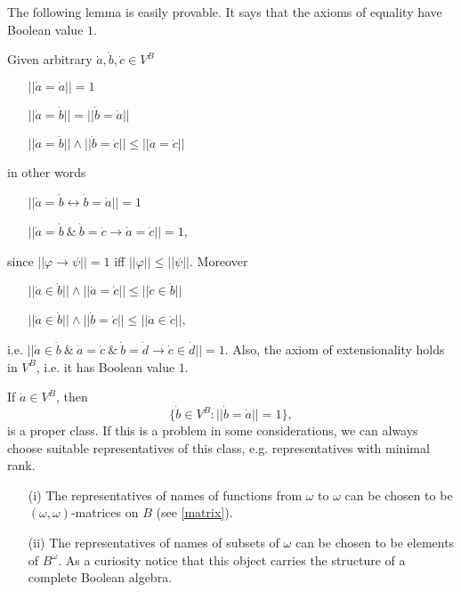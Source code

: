 The following lemma is easily provable. It says that the axioms of equality have Boolean value $1$.

\begin{lemma} Given arbitrary $\dot{a},\dot{b},\dot{c}\in V^B$
 \begin{itemize}
  \item[] $||\dot{a}=\dot{a}||=1$
  \item[] $||\dot{a}=\dot{b}||=||\dot{b}=\dot{a}||$
  \item[] $||\dot{a}=\dot{b}||\wedge||\dot{b}=\dot{c}||\leq||\dot{a}=\dot{c}||$
 \end{itemize}
 in other words
 \begin{itemize}
  \item[] $||\dot{a}=\dot{b}\leftrightarrow\dot{b}=\dot{a}||=1$
  \item[] $||\dot{a}=\dot{b}\ \&\ \dot{b}=\dot{c}\rightarrow\dot{a}=\dot{c}||=1$,
 \end{itemize}
 since $||\varphi\rightarrow\psi||=1$ iff $||\varphi||\leq||\psi||$. Moreover
 \begin{itemize}
  \item[] $||\dot{a}\in\dot{b}||\wedge||\dot{a}=\dot{c}||\leq||\dot{c}\in\dot{b}||$
  \item[] $||\dot{a}\in\dot{b}||\wedge||\dot{b}=\dot{c}||\leq||\dot{a}\in\dot{c}||$,
 \end{itemize}
 i.e. $||\dot{a}\in\dot{b}\ \&\ \dot{a}=\dot{c}\ \&\ \dot{b}=\dot{d} \rightarrow \dot{c}\in\dot{d}||=1$.
 Also, the axiom of extensionality holds in $V^B$, i.e. it has Boolean value $1$.
\end{lemma}

\begin{note} If $\dot{a}\in V^B$, then
 $$
 \{\dot{b}\in V^B:||\dot{b}=\dot{a}||=1\},
 $$
 is a proper class. If this is a problem in some considerations, we can always
 choose suitable representatives of this class, e.g. representatives with minimal rank.
\end{note}

\begin{example}
\begin{itemize}
 \item[(i)] The representatives of names of functions from $\omega$ to $\omega$ can be chosen to be $(\omega,\omega)$-matrices on $B$ (see \ref{matrix}).
 \item[(ii)] The representatives of names of subsets of $\omega$ can be chosen to be elements of $B^\omega$.
             As a curiosity notice that this object carries the structure of a complete Boolean algebra.
\end{itemize}
\end{example}

